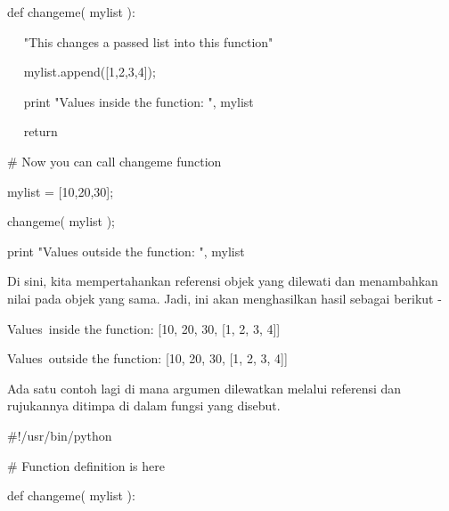 \noindent 
 \hspace*{0.5in} def changeme( mylist ): \par
\noindent 
 \hspace*{0.5in} ~~ "This changes a passed list into this function" \par
\noindent 
~~  \hspace*{0.5in}  \hspace*{0.5in} mylist.append([1,2,3,4]); \par
\noindent 
~~  \hspace*{0.5in} print "Values inside the function: ", mylist \par
\noindent 
~~  \hspace*{0.5in} return \par
\noindent 
 \hspace*{0.5in} \vspace{12pt}
\noindent 
 \hspace*{0.5in}  $  \#  $ Now you can call changeme function \par
\noindent 
 \hspace*{0.5in} mylist = [10,20,30]; \par
\noindent 
 \hspace*{0.5in} changeme( mylist ); \par
\noindent 
 \hspace*{0.5in} print "Values outside the function: ", mylist \par
\noindent 
Di sini, kita mempertahankan referensi objek yang dilewati dan menambahkan nilai pada objek yang sama. Jadi, ini akan menghasilkan hasil sebagai berikut - \par
\noindent 
 \hspace*{0.5in} Values~inside the function:  [10, 20, 30, [1, 2, 3, 4]] \par
\noindent 
 \hspace*{0.5in} Values~outside the function:  [10, 20, 30, [1, 2, 3, 4]] \par
\noindent 
Ada satu contoh lagi di mana argumen dilewatkan melalui referensi dan rujukannya ditimpa di dalam fungsi yang disebut. \par
\noindent 
 \hspace*{0.5in}  $  \#  $!/usr/bin/python \par
\vspace{12pt}
\noindent 
 \hspace*{0.5in}  $  \#  $ Function definition is here \par
\noindent 
 \hspace*{0.5in} def changeme( mylist ): \par
